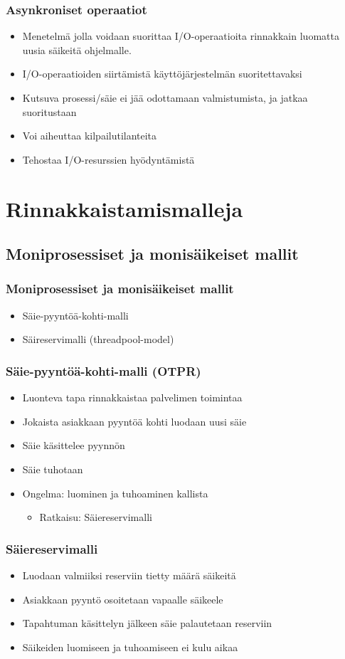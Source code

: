 \documentclass{beamer}
\begin{document}
\begin{frame}
    \frametitle{Asynkroniset operaatiot}
    \begin{itemize}
        \item Menetelmä jolla voidaan suorittaa I/O-operaatioita rinnakkain
            luomatta uusia säikeitä ohjelmalle.
        \item I/O-operaatioiden siirtämistä käyttöjärjestelmän
            suoritettavaksi
        \item Kutsuva prosessi/säie ei jää odottamaan valmistumista,
            ja jatkaa suoritustaan
        \item Voi aiheuttaa kilpailutilanteita
        \item Tehostaa I/O-resurssien hyödyntämistä
    \end{itemize}
\end{frame}
\section{Rinnakkaistamismalleja}
\subsection{Moniprosessiset ja monisäikeiset mallit}
\begin{frame}
    \frametitle{Moniprosessiset ja monisäikeiset mallit}
    \begin{itemize}
        \item Säie-pyyntöä-kohti-malli
        \item Säireservimalli (threadpool-model)
    \end{itemize}
\end{frame}
\begin{frame}
    \frametitle{Säie-pyyntöä-kohti-malli (OTPR)}
    \begin{itemize}
        \item Luonteva tapa rinnakkaistaa palvelimen toimintaa
        \item Jokaista asiakkaan pyyntöä kohti luodaan uusi säie
        \item Säie käsittelee pyynnön
        \item Säie tuhotaan
        \item Ongelma: luominen ja tuhoaminen kallista
            \begin{itemize}
                \item Ratkaisu: Säiereservimalli
            \end{itemize}
    \end{itemize}
\end{frame}
\begin{frame}
    \frametitle{Säiereservimalli}
    \begin{itemize}
        \item Luodaan valmiiksi reserviin tietty määrä säikeitä
        \item Asiakkaan pyyntö osoitetaan vapaalle säikeele
        \item Tapahtuman käsittelyn jälkeen säie palautetaan reserviin
        \item Säikeiden luomiseen ja tuhoamiseen ei kulu aikaa
    \end{itemize}
\end{frame}
\end{document}
